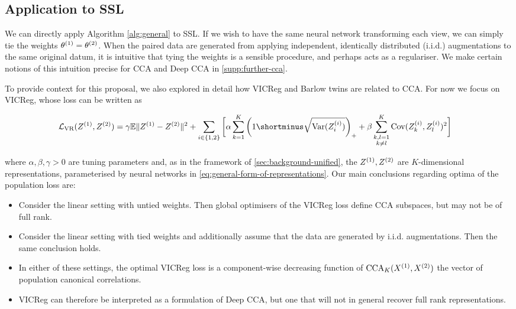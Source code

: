 \subsection{Application to SSL}
We can directly apply Algorithm \ref{alg:general} to SSL.
If we wish to have the same neural network transforming each view, we can simply tie the weights $\theta^{(1)} = \theta^{(2)}$.
When the paired data are generated from applying independent, identically distributed (i.i.d.) augmentations to the same original datum, it is intuitive that tying the weights is a sensible procedure, and perhaps acts as a regulariser.
We make certain notions of this intuition precise for CCA and Deep CCA in \cref{supp:further-cca}.

To provide context for this proposal, we also explored in detail how VICReg and Barlow twins are related to CCA.
For now we focus on VICReg, whose loss can be written as
\begin{small}\begin{align*}
    \mathcal{L}_\text{VR}(Z\sps{1}, Z\sps{2})
    &= \gamma \mathbb{E} \norm{Z^{(1)} - Z^{(2)}}^2 + \sum_{i \in \{1,2\}} \bigg[\alpha \sum_{k=1}^K \left(1 \shortminus \sqrt{\Var(Z\sps{i}_i)}\right)_+ + \beta \sum_{\substack{k,l=1 \\ k \neq l}}^K \Cov(Z\sps{i}_k,Z\sps{i}_l)^2 \bigg]
\end{align*}\end{small}%
where $\alpha, \beta, \gamma > 0$ are tuning parameters and, as in the framework of \cref{sec:background-unified}, the $Z^{(1)}, Z^{(2)}$ are $K$-dimensional representations, parameterised by neural networks in \cref{eq:general-form-of-representations}.
Our main conclusions regarding optima of the population loss are:
\begin{itemize}
    \item Consider the linear setting with untied weights. Then global optimisers of the VICReg loss define CCA subspaces, but may not be of full rank.
    \item Consider the linear setting with tied weights and additionally assume that the data are generated by i.i.d. augmentations. Then the same conclusion holds.
    \item In either of these settings, the optimal VICReg loss is a component-wise decreasing function of $\operatorname{CCA}_K(X^{(1)}, X^{(2)})$ the vector of population canonical correlations.
    \item VICReg can therefore be interpreted as a formulation of Deep CCA, but one that will not in general recover full rank representations.
\end{itemize}

